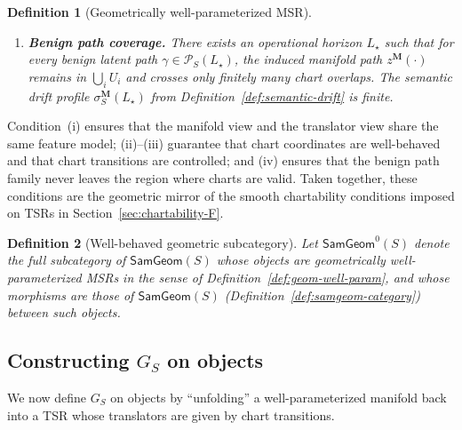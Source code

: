 \documentclass[11pt]{article}
\newtheorem{definition}{Definition}
\newcommand{\SamGeom}{\mathsf{SamGeom}}
\begin{document}
\begin{definition}[Geometrically well-parameterized MSR]
\begin{enumerate}[label=(\roman*),leftmargin=*]
\item \textbf{Benign path coverage.}
There exists an operational horizon $L_\star$ such that for every benign
latent path $\gamma \in \mathcal{P}_S(L_\star)$, the induced manifold path
$z^{\mathbf{M}}(\cdot)$ remains in $\bigcup_i U_i$ and crosses only finitely
many chart overlaps. The semantic drift profile
$\sigma_S^{\mathbf{M}}(L_\star)$ from Definition~\ref{def:semantic-drift}
is finite.

\end{enumerate}
\end{definition}

Condition~(i) ensures that the manifold view and the translator view share
the same feature model; (ii)–(iii) guarantee that chart coordinates are
well-behaved and that chart transitions are controlled; and (iv) ensures
that the benign path family never leaves the region where charts are valid.
Taken together, these conditions are the geometric mirror of the smooth
chartability conditions imposed on TSRs in
Section~\ref{sec:chartability-F}.

\begin{definition}[Well-behaved geometric subcategory]
\label{def:samgeom0}
Let $\SamGeom^0(S)$ denote the full subcategory of $\SamGeom(S)$ whose
objects are geometrically well-parameterized MSRs in the sense of
Definition~\ref{def:geom-well-param}, and whose morphisms are those of
$\SamGeom(S)$ (Definition~\ref{def:samgeom-category}) between such objects.
\end{definition}

\subsection{Constructing \texorpdfstring{$G_S$}{G\_S} on objects}
\label{subsec:G-on-objects}

We now define $G_S$ on objects by ``unfolding'' a well-parameterized manifold
back into a TSR whose translators are given by chart transitions.
\end{document}
